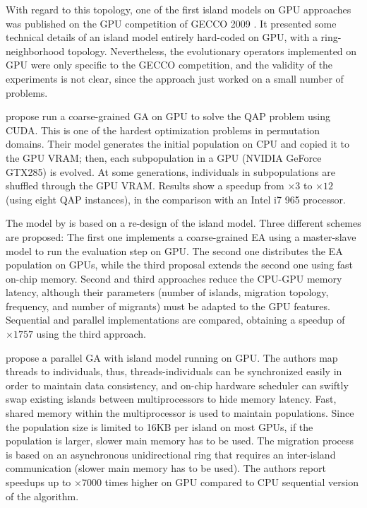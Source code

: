 \documentclass[Afour,sageh,times]{sagej}
\begin{document}
With regard to this topology, one of the first island models on GPU approaches was published on the GPU competition of GECCO 2009 \citep{gecco2009CompetitionPospichal}. It presented some technical details of an island model entirely hard-coded on GPU, with a ring-neighborhood topology. Nevertheless, the evolutionary operators implemented on GPU were only specific to the GECCO competition, and the validity of the experiments is not clear, since the approach just worked on a small number of problems.

\cite{1570355} propose run a coarse-grained GA on GPU to solve the QAP problem using CUDA. This is one of the hardest optimization problems in permutation domains. 
Their model generates the initial population on CPU and copied it to the GPU VRAM; then, each subpopulation in a GPU (NVIDIA GeForce GTX285) is evolved. At some generations, individuals in subpopulations are shuffled through the GPU VRAM. Results show a speedup from $\times3$ to $\times12$ (using eight QAP instances), in the comparison with an Intel i7 965 processor. 

The model by \cite{LUONG:2010:INRIA-00520464:1} is based on a re-design of the island model.
Three different schemes are proposed: The first one implements a coarse-grained EA using a master-slave model to run the evaluation step on GPU. The second one distributes the EA population on GPUs, while the third proposal extends the second one using fast on-chip memory. 
Second and third approaches reduce the CPU-GPU memory latency, although their parameters (number of islands, migration topology, frequency, and number of migrants) must be adapted to the GPU features. 
Sequential and parallel implementations are compared, obtaining a speedup of $\times1757$ using the third approach.

\cite{pospichalParallelGeneticAlgorithOnCUDA2010,9253} propose a parallel GA with island model running on GPU. The authors map threads to individuals, thus, threads-individuals can be synchronized easily in order to maintain data consistency, and on-chip hardware scheduler can swiftly swap existing islands between multiprocessors to hide memory latency. Fast, shared memory within the multiprocessor is used to maintain populations.
Since the population size is limited to 16KB per island on most GPUs, if the population is larger, slower main memory has to be used. The migration process is based on an asynchronous unidirectional ring that requires an inter-island communication (slower main memory has to be used). The authors report speedups up to $\times7000$ times higher on GPU compared to CPU sequential version of the algorithm.
\end{document}

